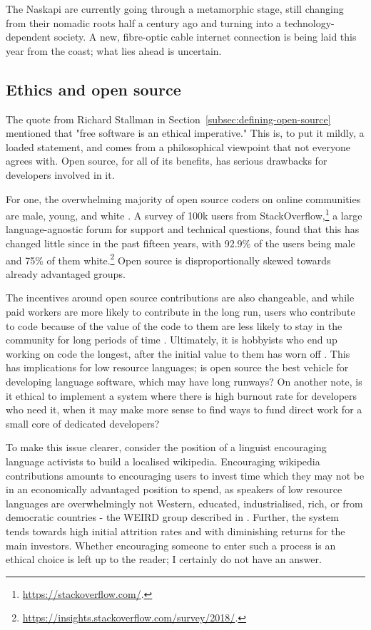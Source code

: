 The Naskapi are currently going through a metamorphic stage, still changing from their nomadic roots half a century ago and turning into a technology-dependent society. A new, fibre-optic cable internet connection is being laid this year from the coast; what lies ahead is uncertain.

\subsection{Ethics and open source}
\label{subsec:oss-ethics}

The quote from Richard Stallman in Section~\ref{subsec:defining-open-source} mentioned that "free software is an ethical imperative." This is, to put it mildly, a loaded statement, and comes from a philosophical viewpoint that not everyone agrees with. Open source, for all of its benefits, has serious drawbacks for developers involved in it.

For one, the overwhelming majority of open source coders on online communities are male, young, and white \citep{ghosh2002free}. A survey of 100k users from StackOverflow,\footnote{\href{https://stackoverflow.com/}{https://stackoverflow.com/}. } a large language-agnostic forum for support and technical questions, found that this has changed little since in the past fifteen years, with 92.9\% of the users being male and 75\% of them white.\footnote{\href{https://insights.stackoverflow.com/survey/2018/}{https://insights.stackoverflow.com/survey/2018/}. } Open source is disproportionally skewed towards already advantaged groups.

The incentives around open source contributions are also changeable, and while paid workers are more likely to contribute in the long run, users who contribute to code because of the value of the code to them are less likely to stay in the community for long periods of time \citep{roberts2006understanding, shah2006motivation}. Ultimately, it is hobbyists who end up working on code the longest, after the initial value to them has worn off \citep{shah2006motivation}. This has implications for low resource languages; is open source the best vehicle for developing language software, which may have long runways? On another note, is it ethical to implement a system where there is high burnout rate for developers who need it, when it may make more sense to find ways to fund direct work for a small core of dedicated developers?

To make this issue clearer, consider the position of a linguist encouraging language activists to build a localised wikipedia. Encouraging wikipedia contributions amounts to encouraging users to invest time which they may not be in an economically advantaged position to spend, as speakers of low resource languages are overwhelmingly not Western, educated, industrialised, rich, or from democratic countries - the WEIRD group described in \citet{henrich2010most}. Further, the system tends towards high initial attrition rates and with diminishing returns for the main investors. Whether encouraging someone to enter such a process is an ethical choice is left up to the reader; I certainly do not have an answer.


